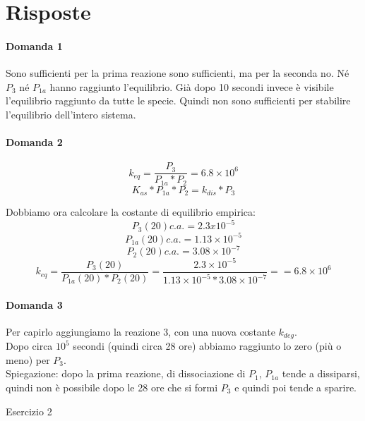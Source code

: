 \documentclass{article}
\begin{document}
\section*{Risposte}
\paragraph{Domanda 1}
Sono sufficienti per la prima reazione sono sufficienti, ma per la seconda no. Né $P_3$ né $P_{1a}$ hanno raggiunto l'equilibrio. Già dopo 10 secondi invece è visibile l'equilibrio raggiunto da tutte le specie.
Quindi non sono sufficienti per stabilire l'equilibrio dell'intero sistema.
\paragraph{Domanda 2}
$$k_{eq} = \frac{ P_3}{P_{1a}*P_2} = 6.8 \times 10^6$$
$$K_{as}*P_{1a}*P_2 = k_{dis}*P_3$$

Dobbiamo ora calcolare la costante di equilibrio empirica:\\
$$P_3(20) c.a. = 2.3x10^{-5}$$
$$P_{1a}(20) c.a. = 1.13 \times 10^{-5}$$
$$P_2(20) c.a. = 3.08 \times 10^{-7}$$
$$k_{eq} = \frac{ P_3(20)}{P_{1a}(20)*P_2(20)} = \frac{2.3 \times 10^{-5}}{1.13 \times 10^{-5}*3.08 \times 10^{-7}} == 6.8 \times 10^{6}$$

\paragraph{Domanda 3}
Per capirlo aggiungiamo la reazione 3, con una nuova costante $k_{deg}$.\\
Dopo circa $10^5$ secondi (quindi circa 28 ore) abbiamo raggiunto lo zero (più o meno) per $P_3$.\\
Spiegazione: dopo la prima reazione, di dissociazione di $P_1$, $P_{1a}$ tende a dissiparsi, quindi non è possibile dopo le 28 ore che si formi $P_3$ e quindi poi tende a sparire.

\newpage
\begin{center}
   \Huge
   Esercizio 2
\end{center} 
\end{document}
